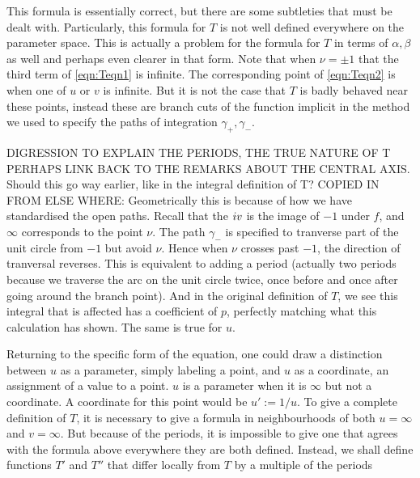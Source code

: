 This formula is essentially correct, but there are some subtleties that must be dealt with. Particularly, this formula for $T$ is not well defined everywhere on the parameter space. This is actually a problem for the formula for $T$ in terms of $α, β$ as well and perhaps even clearer in that form. Note that when $ν = \pm 1$ that the third term of \ref{eqn:Teqn1} is infinite. The corresponding point of \ref{eqn:Teqn2} is when one of $u$ or $v$ is infinite. But it is not the case that $T$ is badly behaved near these points, instead these are branch cuts of the function implicit in the method we used to specify the paths of integration $γ_+, γ_-$.

DIGRESSION TO EXPLAIN THE PERIODS, THE TRUE NATURE OF T PERHAPS LINK BACK TO THE REMARKS ABOUT THE CENTRAL AXIS. Should this go way earlier, like in the integral definition of T?
COPIED IN FROM ELSE WHERE: Geometrically this is because of how we have standardised the open paths. Recall that the $i v$ is the image of $-1$ under $f$, and $\infty$ corresponds to the point $ν$. The path $γ_-$ is specified to tranverse part of the unit circle from $-1$ but avoid $ν$. Hence when $ν$ crosses past $-1$, the direction of tranversal reverses. This is equivalent to adding a period (actually two periods because we traverse the arc on the unit circle twice, once before and once after going around the branch point). And in the original definition of $T$, we see this integral that is affected has a coefficient of $p$, perfectly matching what this calculation has shown. The same is true for $u$. 




Returning to the specific form of the equation, one could draw a distinction between $u$ as a parameter, simply labeling a point, and $u$ as a coordinate, an assignment of a value to a point. $u$ is a parameter when it is $\infty$ but not a coordinate. A coordinate for this point would be $u' := 1/u$. To give a complete definition of $T$, it is necessary to give a formula in neighbourhoods of both $u=\infty$ and $v=\infty$. But because of the periods, it is impossible to give one that agrees with the formula above everywhere they are both defined. Instead, we shall define functions $T'$ and $T''$ that differ locally from $T$ by a multiple of the periods

